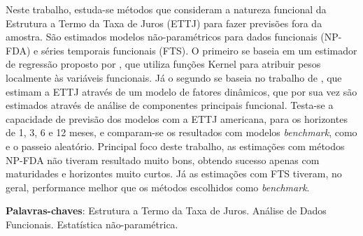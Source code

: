 \documentclass[
	12pt,				%
	openright,			%
	oneside,			%
	a4paper,			%
	english,			%
	brazil				%
	]{dissertacao-ufrgs-abntex2}
\begin{document}

\setlength{\absparsep}{18pt} %
\begin{resumo}

Neste trabalho, estuda-se métodos que consideram a natureza funcional da Estrutura a Termo da Taxa de Juros (ETTJ) para fazer previsões fora da amostra. São estimados modelos não-paramétricos para dados funcionais (NP-FDA) e séries temporais funcionais (FTS). O primeiro se baseia em um estimador de regressão  proposto por , que utiliza funções Kernel para atribuir pesos localmente às variáveis funcionais. Já o segundo se baseia no trabalho de , que estimam a ETTJ através de um modelo de fatores dinâmicos, que por sua vez são estimados através de análise de componentes principais funcional. 
Testa-se a capacidade de previsão dos modelos com a ETTJ americana, para os horizontes de 1, 3, 6 e 12 meses, e comparam-se os resultados com modelos \emph{benchmark}, como  e o passeio aleatório. 
Principal foco deste trabalho, as estimações com métodos NP-FDA não tiveram resultado muito bons, obtendo sucesso apenas com maturidades e horizontes muito curtos. Já as estimações com FTS tiveram, no geral, performance melhor que os métodos escolhidos como \emph{benchmark}.

 \textbf{Palavras-chaves}: Estrutura a Termo da Taxa de Juros. Análise de Dados Funcionais. Estatística não-paramétrica.
\end{resumo}
\end{document}

